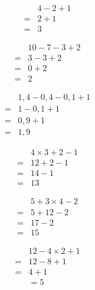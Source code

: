 \begin{multicols}{3}
  \begin{align*}
    &4-2+1\\
    =&2+1\\
    =&3
  \end{align*}
  \vspace{1em}

  \begin{align*}
    &10-7-3+2\\
    =&3-3+2\\
    =&0+2\\
    =&2
  \end{align*}

  \begin{align*}
    &1,4-0,4-0,1+1\\
    =&1-0,1+1\\
    =&0,9+1\\
    =&1,9
  \end{align*}
\end{multicols}

\separe

\begin{multicols}{3}
  \begin{align*}
    &4\times 3+2-1\\
    =&12+2-1\\
    =&14-1\\
    =&13
  \end{align*}

  \begin{align*}
    &5+3\times 4-2\\
    =&5+12-2\\
    =&17-2\\
    =&15
  \end{align*}

  \begin{align*}
    &12-4\times 2+1\\
    =&12-8+1\\
    =&4+1\\
    &=5
  \end{align*}
\end{multicols}

\separe

